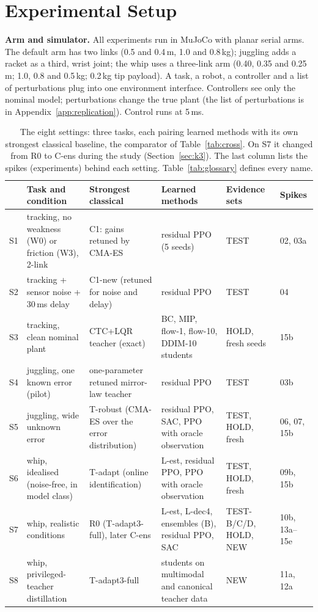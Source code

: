\section{Experimental Setup}
\label{sec:setup}


\textbf{Arm and simulator.} All experiments run in MuJoCo with planar serial arms. The default arm has two links (0.5 and 0.4\,m, 1.0 and 0.8\,kg); juggling adds a racket as a third, wrist joint; the whip uses a three-link arm (0.40, 0.35 and 0.25\,m; 1.0, 0.8 and 0.5\,kg; 0.2\,kg tip payload). A task, a robot, a controller and a list of perturbations plug into one environment interface. Controllers see only the nominal model; perturbations change the true plant (the list of perturbations is in Appendix~\ref{app:replication}). Control runs at 5\,ms.

\begin{table}[t]
\centering
\caption{The eight settings: three tasks, each pairing learned methods with its own strongest classical baseline, the comparator of Table~\ref{tab:cross}. On S7 it changed from R0 to C-ens during the study (Section~\ref{sec:k3}). The last column lists the spikes (experiments) behind each setting. Table~\ref{tab:glossary} defines every name.}
\label{tab:settings}
\small
\begin{tabular}{@{}lp{3.1cm}p{3.3cm}p{4.0cm}p{3.0cm}p{1.7cm}@{}}
\toprule
 & Task and condition & Strongest classical & Learned methods & Evidence sets & Spikes \\ \midrule
S1 & tracking, no weakness (W0) or friction (W3), 2-link & C1: gains retuned by CMA-ES & residual PPO (5 seeds) & TEST & 02, 03a \\
S2 & tracking + sensor noise + 30\,ms delay & C1-new (retuned for noise and delay) & residual PPO & TEST & 04 \\
S3 & tracking, clean nominal plant & CTC+LQR teacher (exact) & BC, MIP, flow-1, flow-10, DDIM-10 students & HOLD, fresh seeds & 15b \\
S4 & juggling, one known error (pilot) & one-parameter retuned mirror-law teacher & residual PPO & TEST & 03b \\
S5 & juggling, wide unknown error & T-robust (CMA-ES over the error distribution) & residual PPO, SAC, PPO with oracle observation & TEST, HOLD, fresh & 06, 07, 15b \\
S6 & whip, idealised (noise-free, in model class) & T-adapt (online identification) & L-est, residual PPO, PPO with oracle observation & TEST, HOLD, fresh & 09b, 15b \\
S7 & whip, realistic conditions & R0 (T-adapt3-full), later C-ens & L-est, L-dec4, ensembles (B), residual PPO, SAC & TEST-B/C/D, HOLD, NEW & 10b, 13a--15e \\
S8 & whip, privileged-teacher distillation & T-adapt3-full & students on multimodal and canonical teacher data & NEW & 11a, 12a \\
\bottomrule
\end{tabular}
\end{table}

